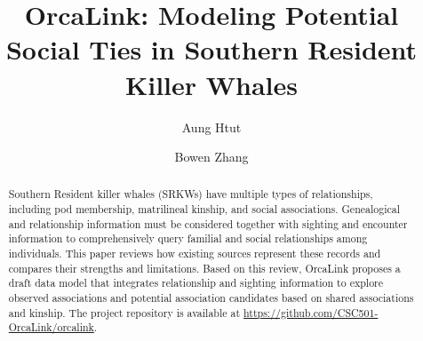 \documentclass[sigconf]{acmart}
\begin{document}
\pagestyle{empty}
\title{\textbf{OrcaLink: Modeling Potential Social Ties in Southern Resident Killer Whales}}


\author{Aung Htut}
\author{Bowen Zhang}

\begin{abstract}
Southern Resident killer whales (SRKWs) have multiple types of relationships, including pod membership, matrilineal kinship, and social associations. Genealogical and relationship information must be considered together with sighting and encounter information to comprehensively query familial and social relationships among individuals. This paper reviews how existing sources represent these records and compares their strengths and limitations. Based on this review, OrcaLink proposes a draft data model that integrates relationship and sighting information to explore observed associations and potential association candidates based on shared associations and kinship. The project repository is available at \url{https://github.com/CSC501-OrcaLink/orcalink}.
\end{abstract}

\maketitle
\end{document}
